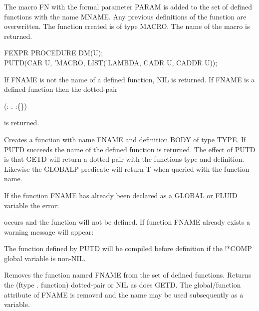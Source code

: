 {The macro FN with the formal parameter PARAM is added to the set of
defined functions with the name MNAME. Any previous definitions of the
function are overwritten. The function created is of type MACRO.
The name of the macro is returned.

{\tt \begin{tabbing} FEXPR PROCEDURE DM(U); \\
\hspace*{1em} PUTD(CAR U, 'MACRO, LIST('LAMBDA, CADR U, CADDR U));
\end{tabbing} }
}


{If FNAME is not the name of a defined function, NIL is returned. If
FNAME is a defined function then the dotted-pair

\vspace{.15in}
(: . :\{\})
\vspace{.15in}

is returned.}


{Creates a function with name FNAME and definition BODY of type TYPE.
If PUTD succeeds the name of the defined function is returned. The
effect of PUTD is that GETD will return a dotted-pair with the
functions type and definition. Likewise the GLOBALP predicate will
 
return T when queried with the function name.

If the function FNAME has already been declared as a GLOBAL or FLUID
variable the error:


occurs and the function will not be defined. If function FNAME already
exists a warning message will appear:


The function defined by PUTD will be compiled before definition
 if the !*COMP global variable is non-NIL.}


{Removes the function named FNAME from the set of defined functions.
Returns the (ftype . function) dotted-pair or NIL as does GETD. The
global/function attribute of FNAME is removed and the name may be used
subsequently as a variable.}



